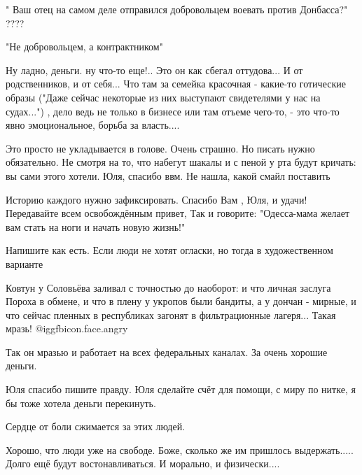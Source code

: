 \begin{itemize}
\begin{itemize}
" Ваш отец на самом деле отправился добровольцем воевать против Донбасса?" ????


"Не добровольцем, а контрактником"

Ну ладно, деньги. ну что-то еще!.. Это он как сбегал оттудова... И от
родственников, и от себя... Что там за семейка красочная - какие-то готические
образы ("Даже сейчас некоторые из них выступают свидетелями у нас на судах...")
, дело ведь не только в бизнесе или там отъеме чего-то, - это что-то явно
эмоциональное, борьба за власть....

\end{itemize} %


Это просто не укладывается в голове. Очень страшно. Но писать нужно
обязательно. Не смотря на то, что набегут шакалы и с пеной у рта будут кричать:
вы сами этого хотели. Юля, спасибо ввм. Не нашла, какой смайл поставить



Историю каждого нужно зафиксировать. Спасибо Вам , Юля, и удачи! Передавайте
всем освобождённым привет, Так и говорите: "Одесса-мама желает вам стать на
ноги и начать новую жизнь!"


Напишите как есть. Если люди не хотят огласки, но тогда в художественном варианте


Ковтун у Соловьёва заливал с точностью до наоборот: и что личная заслуга Пороха
в обмене, и что в плену у укропов были бандиты, а у дончан - мирные, и что
сейчас пленных в республиках загонят в фильтрационные лагеря... Такая мразь!  @igg{fbicon.face.angry} 

\begin{itemize} %
Так он мразью и работает на всех федеральных каналах. За очень хорошие деньги.
\end{itemize} %

Юля спасибо пишите правду. Юля сделайте счёт для помощи, с миру по нитке, я бы тоже хотела деньги перекинуть.

Сердце от боли сжимается за этих людей.


Хорошо, что люди уже на свободе. Боже, сколько же им пришлось выдержать.....
Долго ещё будут востонавливаться. И морально, и физически....


\end{itemize}
